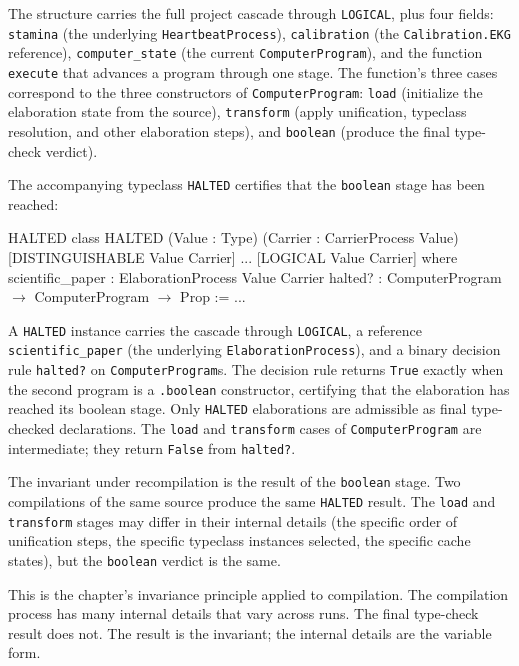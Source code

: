 The structure carries the full project cascade through
\texttt{LOGICAL}, plus four fields: \texttt{stamina} (the
underlying \texttt{HeartbeatProcess}), \texttt{calibration} (the
\texttt{Calibration.EKG} reference), \texttt{computer\_state} (the
current \texttt{ComputerProgram}), and the function
\texttt{execute} that advances a program through one stage. The
function's three cases correspond to the three constructors of
\texttt{ComputerProgram}: \texttt{load} (initialize the
elaboration state from the source), \texttt{transform} (apply
unification, typeclass resolution, and other elaboration steps),
and \texttt{boolean} (produce the final type-check verdict).

The accompanying typeclass \texttt{HALTED} certifies that the
\texttt{boolean} stage has been reached:

\begin{leanexcerpt}{HALTED}
class HALTED
    (Value : Type)
    (Carrier : CarrierProcess Value)
    [DISTINGUISHABLE Value Carrier] ... [LOGICAL Value Carrier]
  where
  scientific_paper : ElaborationProcess Value Carrier
  halted? : ComputerProgram $\to$ ComputerProgram $\to$ Prop := ...
\end{leanexcerpt}

A \texttt{HALTED} instance carries the cascade through
\texttt{LOGICAL}, a reference \texttt{scientific\_paper} (the
underlying \texttt{ElaborationProcess}), and a binary decision rule
\texttt{halted?} on \texttt{ComputerProgram}s. The decision rule
returns \texttt{True} exactly when the second program is a
\texttt{.boolean} constructor, certifying that the elaboration has
reached its boolean stage. Only \texttt{HALTED} elaborations are
admissible as final type-checked declarations. The \texttt{load}
and \texttt{transform} cases of \texttt{ComputerProgram} are
intermediate; they return \texttt{False} from \texttt{halted?}.

The invariant under recompilation is the result of the
\texttt{boolean} stage. Two compilations of the same source
produce the same \texttt{HALTED} result. The \texttt{load} and
\texttt{transform} stages may differ in their internal details
(the specific order of unification steps, the specific typeclass
instances selected, the specific cache states), but the
\texttt{boolean} verdict is the same.

This is the chapter's invariance principle applied to compilation.
The compilation process has many internal details that vary across
runs. The final type-check result does not. The result is the
invariant; the internal details are the variable form.

